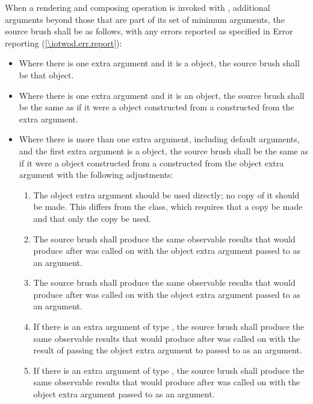 \pnum
When a rendering and composing operation is invoked with , additional arguments beyond those that are part of its set of minimum arguments, the source brush shall be as follows, with any errors reported as specified in Error reporting (\ref{\iotwod.err.report}):
\begin{itemize}
	\item Where there is one extra argument and it is a  object, the source brush shall be that  object.
	\item Where there is one extra argument and it is an  object, the source brush shall be the same as if it were a  object constructed from a  constructed from the extra argument.
	\item Where there is more than one extra argument, including default arguments, and the first extra argument is a  object, the source brush shall be the same as if it were a  object  constructed from a  constructed from the  object extra argument with the following adjustments:
	\begin{enumerate}
		\item The  object extra argument should be used directly; no copy of it should be made. This differs from the  class, which requires that a copy be made and that only the copy be used.
		\item The source brush shall produce the same observable results that  would produce after  was called on  with the  object extra argument passed to  as an argument.
		\item The source brush shall produce the same observable results that  would produce after  was called on  with the  object extra argument passed to  as an argument.
		\item If there is an extra argument of type , the source brush shall produce the same observable results that  would produce after  was called on  with the result of passing the  object extra argument to  passed to  as an argument.
		\item If there is an extra argument of type , the source brush shall produce the same observable results that  would produce after  was called on  with the  object extra argument passed to  as an argument.
	\end{enumerate}
\end{itemize}

